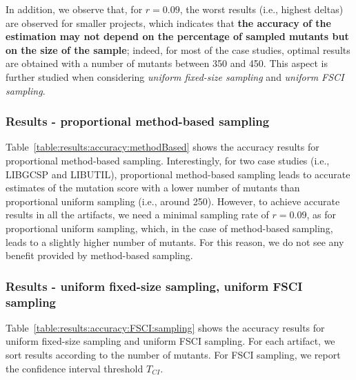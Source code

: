 

In addition, we observe that, for $r=0.09$, the worst results (i.e., highest deltas) are observed for smaller projects, which indicates that \textbf{the accuracy of the estimation may not depend on the percentage of sampled mutants but on the size of the sample}; indeed, for most of the case studies, optimal results are obtained with a number of mutants between 350 and 450. This aspect is further studied when considering  \emph{uniform fixed-size sampling} and \emph{uniform FSCI sampling}.

\subsubsection*{Results - proportional method-based sampling}

Table~\ref{table:results:accuracy:methodBased} shows the accuracy results for proportional method-based sampling. 
Interestingly, for two case studies (i.e., LIBGCSP and LIBUTIL), proportional method-based sampling leads to accurate estimates of the mutation score with a lower number of mutants than proportional uniform sampling (i.e., around 250).
{However, to achieve accurate results in all the artifacts, we need a minimal sampling rate of $r=0.09$, as for proportional uniform sampling, which, in the case of method-based sampling, leads to a slightly higher number of mutants. For this reason, we do not see any benefit provided by method-based sampling.}



\subsubsection*{Results - uniform fixed-size sampling, uniform FSCI sampling}



Table~\ref{table:results:accuracy:FSCI:sampling} shows the accuracy results for uniform fixed-size sampling and uniform FSCI sampling. For each artifact, we sort results according to the number of mutants. For FSCI sampling, we report the confidence interval threshold $T_\mathit{CI}$. 

